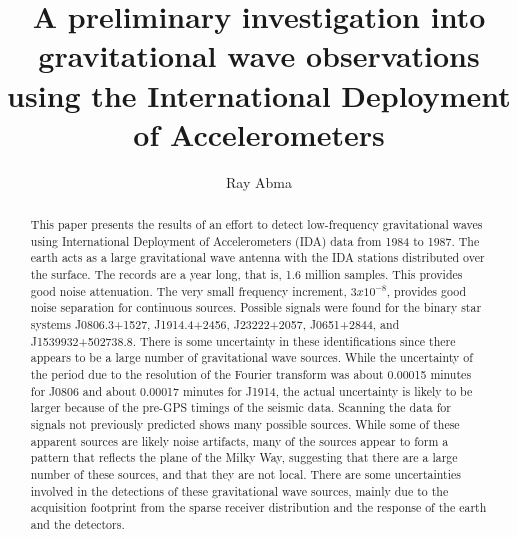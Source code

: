 \title{A preliminary investigation into gravitational wave observations using the International Deployment of Accelerometers}



\author{
Ray Abma
}
\maketitle


\address{
\footnotemark[1] Bureau of Economic Geology \\
John A. and Katherine G. Jackson School of Geosciences \\
The University of Texas at Austin \\
University Station, Box X \\
Austin, TX 78713-8924, USA \\
ray.abma@gmail.com 
}


\maketitle


\begin{abstract}
This paper presents the results of an effort to detect low-frequency gravitational waves using International Deployment of Accelerometers (IDA) data from 1984 to 1987.
The earth acts as a large gravitational wave antenna 
with the IDA stations distributed over the surface.  The records are a year long, that is, 1.6 million samples.  
This provides good noise attenuation.  
The very small frequency increment, $3x10^{-8}$, provides good noise separation for continuous sources.
Possible signals were found for the binary star systems J0806.3+1527, J1914.4+2456, J23222+2057, J0651+2844, and J1539932+502738.8.  There is some uncertainty in these identifications since there appears to be a large number of gravitational wave sources.  
While the uncertainty of the period due to the resolution of the Fourier transform was about 0.00015 minutes for J0806 and about 0.00017 minutes for J1914, the actual uncertainty is likely to be larger because of the pre-GPS timings of the seismic data.  
Scanning the data for signals not previously predicted shows many possible sources.  
While some of these apparent sources are likely noise artifacts, many of the sources appear to form a pattern that reflects the plane of the Milky Way, 
suggesting that there are a large number of these sources, and that they are not local.  
There are some uncertainties involved in the detections of these gravitational wave sources, mainly due to the acquisition footprint from the sparse receiver distribution and the response of the earth and the detectors.  
\end{abstract}

